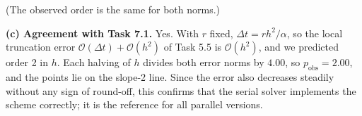 \documentclass[11pt,a4paper]{article}
\begin{document}
\medskip
(The observed order is the same for both norms.)

\textbf{(c) Agreement with Task 7.1.} Yes. With $r$ fixed, $\Delta t=rh^2/\alpha$, so the local
truncation error $\mathcal O(\Delta t)+\mathcal O(h^2)$ of Task 5.5 is $\mathcal O(h^2)$, and we
predicted order 2 in $h$. Each halving of $h$ divides both error norms by $4.00$, so
$p_{\text{obs}}=2.00$, and the points lie on the slope-2 line. Since the error also decreases
steadily without any sign of round-off, this confirms that the serial solver implements the scheme
correctly; it is the reference for all parallel versions.
\end{document}
